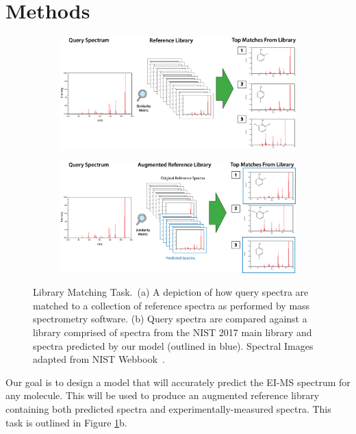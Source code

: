 \section{Methods}


\begin{figure}[ht]
    \centering
    \begin{subfigure}{0.9\textwidth}
        \includegraphics[width=\textwidth]{./lib_match_baseline.png}
        \caption{}
    \end{subfigure}
    \begin{subfigure}{0.9\textwidth}
        \includegraphics[width=\textwidth]{./lib_match_predicted.png}
        \caption{}
    \end{subfigure}
    \caption[Library Matching Task]{Library Matching Task.~(a) A depiction of how query spectra are matched to a collection of reference spectra as performed by mass spectrometry software. (b) Query spectra are compared against a library comprised of spectra from the NIST 2017 main library and spectra predicted by our model (outlined in blue).  Spectral Images adapted from NIST Webbook~\cite{NIST_WebBook}.}
    \label{fig:library_matching}
\end{figure}



Our goal is to design a model that will accurately predict the EI-MS spectrum for any molecule. This will be used to produce an augmented reference library containing both predicted spectra and experimentally-measured spectra.  This task is outlined in Figure \ref{fig:library_matching}b.

